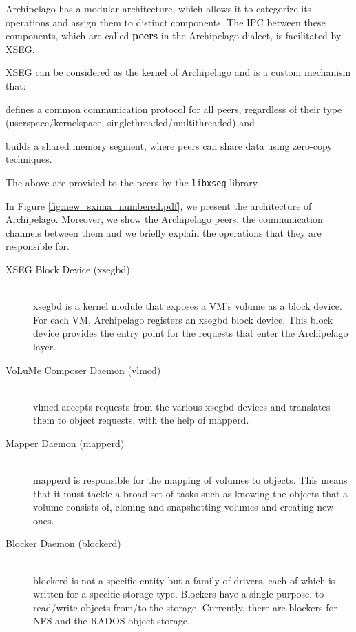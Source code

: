 Archipelago has a modular architecture, which allows it to categorize its 
operations and assign them to distinct components. The IPC between these 
components, which are called \textbf{peers} in the Archipelago dialect, is 
facilitated by XSEG.

XSEG can be considered as the kernel of Archipelago and is a custom mechanism 
that:
\begin{inparaenum}[i)]
\item defines a common communication protocol for all peers, regardless of 
	their type (userspace/kernelspace, singlethreaded/multithreaded) and
\item builds a shared memory segment, where peers can share data using 
	zero-copy techniques.
\end{inparaenum}
The above are provided to the peers by the \texttt{libxseg} library.

In Figure \ref{fig:new_sxima_numbered.pdf}, we present the architecture of 
Archipelago.  Moreover, we show the Archipelago peers, the communication 
channels between them and we briefly explain the operations that they are 
responsible for.


\begin{description}
	\item[XSEG Block Device (xsegbd)] \hfill \\
		xsegbd is a kernel module that exposes a VM's volume as a block 
		device. For each VM, Archipelago registers an xsegbd block 
		device. This block device provides the entry point for the 
		requests that enter the Archipelago layer.
	\item[VoLuMe Composer Daemon (vlmcd)] \hfill \\
		vlmcd accepts requests from the various xsegbd devices and 
		translates them to object requests, with the help of mapperd.
	\item[Mapper Daemon (mapperd)] \hfill \\
		mapperd is responsible for the mapping of volumes to objects.  
		This means that it must tackle a broad set of tasks such as 
		knowing the objects that a volume consists of, cloning and 
		snapshotting volumes and creating new ones.
	\item[Blocker Daemon (blockerd)] \hfill \\
		blockerd is not a specific entity but a family of drivers, each 
		of which is written for a specific storage type. Blockers have 
		a single purpose, to read/write objects from/to the storage.  
		Currently, there are blockers for NFS and the RADOS object 
		storage.
\end{description}

